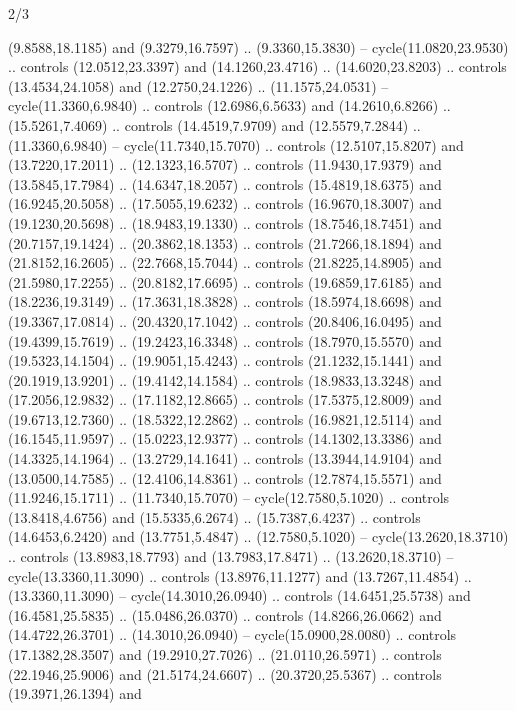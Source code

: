 \begin{flagdescription}{2/3}
\begin{scope}[yshift=\flagwidth,scale=\flagwidth/1241.93737]
\begin{scope}[y=-1mm, x=1mm,draw=gold,fill=blue,line join=miter,miter limit=4,line width=1.8\lw]
\begin{scope}[y=1mm, x=1mm, yscale=-1,shift={(573.68mm+\str,145.75)}]
\begin{scope}[scale=1.35,shift={(-9,-3)}]
\begin{scope}[scale=0.55]
\begin{scope}[scale=1.333]
    (9.8588,18.1185) and (9.3279,16.7597) .. (9.3360,15.3830) --
    cycle(11.0820,23.9530) .. controls (12.0512,23.3397) and (14.1260,23.4716) ..
    (14.6020,23.8203) .. controls (13.4534,24.1058) and (12.2750,24.1226) ..
    (11.1575,24.0531) -- cycle(11.3360,6.9840) .. controls (12.6986,6.5633) and
    (14.2610,6.8266) .. (15.5261,7.4069) .. controls (14.4519,7.9709) and
    (12.5579,7.2844) .. (11.3360,6.9840) -- cycle(11.7340,15.7070) .. controls
    (12.5107,15.8207) and (13.7220,17.2011) .. (12.1323,16.5707) .. controls
    (11.9430,17.9379) and (13.5845,17.7984) .. (14.6347,18.2057) .. controls
    (15.4819,18.6375) and (16.9245,20.5058) .. (17.5055,19.6232) .. controls
    (16.9670,18.3007) and (19.1230,20.5698) .. (18.9483,19.1330) .. controls
    (18.7546,18.7451) and (20.7157,19.1424) .. (20.3862,18.1353) .. controls
    (21.7266,18.1894) and (21.8152,16.2605) .. (22.7668,15.7044) .. controls
    (21.8225,14.8905) and (21.5980,17.2255) .. (20.8182,17.6695) .. controls
    (19.6859,17.6185) and (18.2236,19.3149) .. (17.3631,18.3828) .. controls
    (18.5974,18.6698) and (19.3367,17.0814) .. (20.4320,17.1042) .. controls
    (20.8406,16.0495) and (19.4399,15.7619) .. (19.2423,16.3348) .. controls
    (18.7970,15.5570) and (19.5323,14.1504) .. (19.9051,15.4243) .. controls
    (21.1232,15.1441) and (20.1919,13.9201) .. (19.4142,14.1584) .. controls
    (18.9833,13.3248) and (17.2056,12.9832) .. (17.1182,12.8665) .. controls
    (17.5375,12.8009) and (19.6713,12.7360) .. (18.5322,12.2862) .. controls
    (16.9821,12.5114) and (16.1545,11.9597) .. (15.0223,12.9377) .. controls
    (14.1302,13.3386) and (14.3325,14.1964) .. (13.2729,14.1641) .. controls
    (13.3944,14.9104) and (13.0500,14.7585) .. (12.4106,14.8361) .. controls
    (12.7874,15.5571) and (11.9246,15.1711) .. (11.7340,15.7070) --
    cycle(12.7580,5.1020) .. controls (13.8418,4.6756) and (15.5335,6.2674) ..
    (15.7387,6.4237) .. controls (14.6453,6.2420) and (13.7751,5.4847) ..
    (12.7580,5.1020) -- cycle(13.2620,18.3710) .. controls (13.8983,18.7793) and
    (13.7983,17.8471) .. (13.2620,18.3710) -- cycle(13.3360,11.3090) .. controls
    (13.8976,11.1277) and (13.7267,11.4854) .. (13.3360,11.3090) --
    cycle(14.3010,26.0940) .. controls (14.6451,25.5738) and (16.4581,25.5835) ..
    (15.0486,26.0370) .. controls (14.8266,26.0662) and (14.4722,26.3701) ..
    (14.3010,26.0940) -- cycle(15.0900,28.0080) .. controls (17.1382,28.3507) and
    (19.2910,27.7026) .. (21.0110,26.5971) .. controls (22.1946,25.9006) and
    (21.5174,24.6607) .. (20.3720,25.5367) .. controls (19.3971,26.1394) and

\end{scope}
\end{scope}
\end{scope}
\end{scope}
\end{scope}
\end{scope}
\end{flagdescription}
